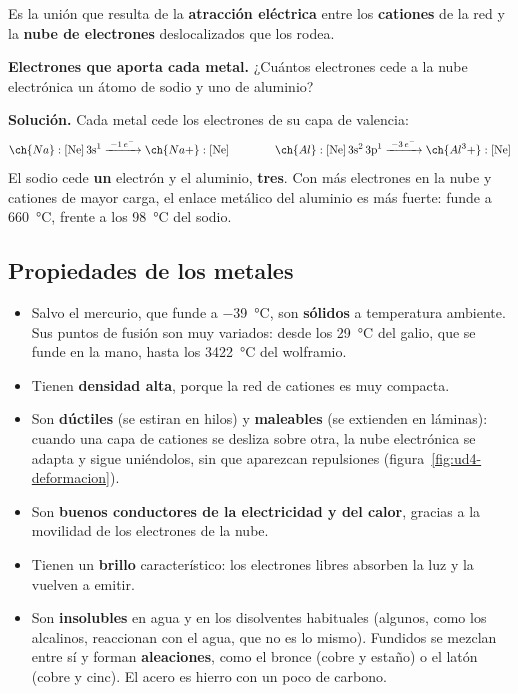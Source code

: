 \begin{definition}
    Es la unión que resulta de la \textbf{atracción eléctrica} entre los \textbf{cationes} de la red y la \textbf{nube de
    electrones} deslocalizados que los rodea.
\end{definition}

\begin{example}
    \textbf{Electrones que aporta cada metal.} ¿Cuántos electrones cede a la nube electrónica un átomo de sodio y uno de aluminio?

    \textbf{Solución.} Cada metal cede los electrones de su capa de valencia:
    \[ \ch{Na}: \conf{[Ne]\,3s^1} \xrightarrow{\;-1\,e^-\;} \ch{Na+}: \conf{[Ne]} \qquad\qquad
    \ch{Al}: \conf{[Ne]\,3s^2\,3p^1} \xrightarrow{\;-3\,e^-\;} \ch{Al^3+}: \conf{[Ne]} \]
    El sodio cede \textbf{un} electrón y el aluminio, \textbf{tres}. Con más electrones en la nube y cationes de mayor carga, el
    enlace metálico del aluminio es más fuerte: funde a \qty{660}{\degreeCelsius}, frente a los \qty{98}{\degreeCelsius} del sodio.
\end{example}

\subsection{Propiedades de los metales}

\begin{itemize}
    \item Salvo el mercurio, que funde a \qty{-39}{\degreeCelsius}, son \textbf{sólidos} a temperatura ambiente. Sus puntos de
    fusión son muy variados: desde los \qty{29}{\degreeCelsius} del galio, que se funde en la mano, hasta los
    \qty{3422}{\degreeCelsius} del wolframio.
    \item Tienen \textbf{densidad alta}, porque la red de cationes es muy compacta.
    \item Son \textbf{dúctiles} (se estiran en hilos) y \textbf{maleables} (se extienden en láminas): cuando una capa de cationes
    se desliza sobre otra, la nube electrónica se adapta y sigue uniéndolos, sin que aparezcan repulsiones
    (figura~\ref{fig:ud4-deformacion}).
    \item Son \textbf{buenos conductores de la electricidad y del calor}, gracias a la movilidad de los electrones de la nube.
    \item Tienen un \textbf{brillo} característico: los electrones libres absorben la luz y la vuelven a emitir.
    \item Son \textbf{insolubles} en agua y en los disolventes habituales (algunos, como los alcalinos, reaccionan con el agua, que
    no es lo mismo). Fundidos se mezclan entre sí y forman \textbf{aleaciones}, como el bronce (cobre y estaño) o el latón (cobre y
    cinc). El acero es hierro con un poco de carbono.
\end{itemize}

